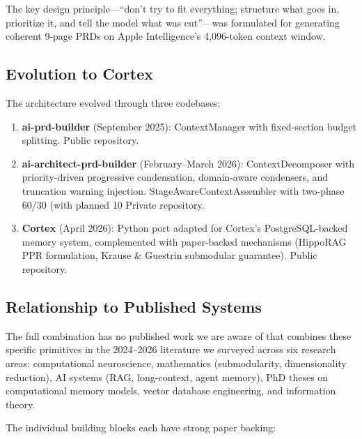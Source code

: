 \documentclass[11pt]{article}
\begin{document}
The key design principle---``don't try to fit everything; structure
what goes in, prioritize it, and tell the model what was cut''---was
formulated for generating coherent 9-page PRDs on Apple Intelligence's
4,096-token context window.

\subsection{Evolution to Cortex}

The architecture evolved through three codebases:

\begin{enumerate}
  \item \textbf{ai-prd-builder} (September 2025): ContextManager with
    fixed-section budget splitting.  Public repository.

  \item \textbf{ai-architect-prd-builder} (February--March 2026):
    ContextDecomposer with priority-driven progressive condensation,
    domain-aware condensers, and truncation warning injection.
    StageAwareContextAssembler with two-phase 60/30 (with planned 10%
    Private repository.

  \item \textbf{Cortex} (April 2026): Python port adapted for
    Cortex's PostgreSQL-backed memory system, complemented with
    paper-backed mechanisms (HippoRAG PPR formulation, Krause \&
    Guestrin submodular guarantee).  Public repository.
\end{enumerate}

\subsection{Relationship to Published Systems}

The full combination has no published work we are aware of that combines these specific primitives in the 2024--2026
literature we surveyed across six research areas: computational
neuroscience, mathematics (submodularity, dimensionality reduction),
AI systems (RAG, long-context, agent memory), PhD theses on
computational memory models, vector database engineering, and
information theory.

The individual building blocks each have strong paper backing:
\end{document}
